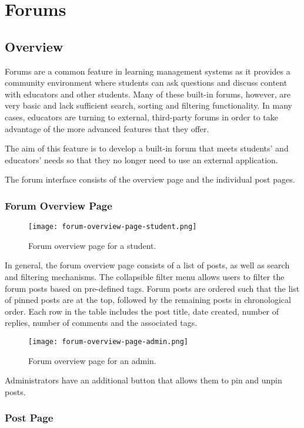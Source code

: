 \section{Forums}
\subsection{Overview}
Forums are a common feature in learning management systems as it provides a community environment where students can ask questions and discuss content with educators and other students.
Many of these built-in forums, however, are very basic and lack sufficient search, sorting and filtering functionality.
In many cases, educators are turning to external, third-party forums in order to take advantage of the more advanced features that they offer.

The aim of this feature is to develop a built-in forum that meets students' and educators' needs so that they no longer need to use an external application.

The forum interface consists of the overview page and the individual post pages.

\subsubsection{Forum Overview Page}

\begin{figure}[h!]
    \texttt{[image: forum-overview-page-student.png]}
    \centering
    \caption{Forum overview page for a student.}
\end{figure}

In general, the forum overview page consists of a list of posts, as well as search and filtering mechanisms.
The collapsible filter menu allows users to filter the forum posts based on pre-defined tags.
Forum posts are ordered such that the list of pinned posts are at the top, followed by the remaining posts in chronological order.
Each row in the table includes the post title, date created, number of replies, number of comments and the associated tags.

\begin{figure}[h!]
    \texttt{[image: forum-overview-page-admin.png]}
    \centering
    \caption{Forum overview page for an admin.}
\end{figure}

Administrators have an additional button that allows them to pin and unpin posts.

\subsubsection{Post Page}

